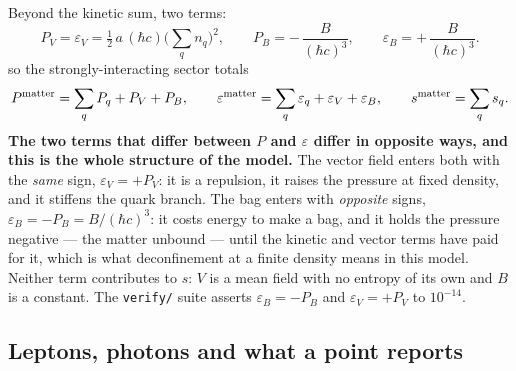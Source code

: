 \documentclass[aps,prc,onecolumn,superscriptaddress,nofootinbib,10pt]{revtex4-2}
\newcommand{\hc}{(\hbar c)^3}
\begin{document}
Beyond the kinetic sum, two terms:
%
\begin{equation}
P_V = \varepsilon_V = \tfrac12\, a\, (\hbar c) \Big( \sum_q n_q \Big)^{\!2} ,
\qquad
P_B = -\,\frac{B}{\hc} , \qquad
\varepsilon_B = +\,\frac{B}{\hc} .
\label{eq:vectorbag}
\end{equation}
%
so the strongly-interacting sector totals
%
\begin{equation}
P^{\rm matter} = \sum_q P_q + P_V + P_B , \qquad
\varepsilon^{\rm matter} = \sum_q \varepsilon_q + \varepsilon_V
                           + \varepsilon_B , \qquad
s^{\rm matter} = \sum_q s_q .
\label{eq:mattertotals}
\end{equation}
%
\textbf{The two terms that differ between $P$ and $\varepsilon$ differ in
opposite ways, and this is the whole structure of the model.} The vector field
enters both with the \emph{same} sign, $\varepsilon_V = +P_V$: it is a
repulsion, it raises the pressure at fixed density, and it stiffens the quark
branch. The bag enters with \emph{opposite} signs,
$\varepsilon_B = -P_B = B/\hc$: it costs energy to make a bag, and it holds
the pressure negative --- the matter unbound --- until the kinetic and vector
terms have paid for it, which is what deconfinement at a finite density means
in this model. Neither term contributes to $s$: $V$ is a mean field with no
entropy of its own and $B$ is a constant. The \texttt{verify/} suite asserts
$\varepsilon_B = -P_B$ and $\varepsilon_V = +P_V$ to $10^{-14}$.

\subsection{Leptons, photons and what a point reports}
\end{document}
